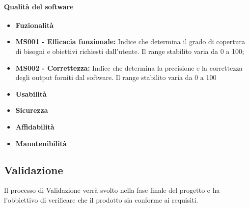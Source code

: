 \paragraph{Qualità del software} 
\begin{itemize}
	\item []\textbf{Fuzionalità}%
	\item \textbf{MS001 - Efficacia funzionale:} Indice che determina il grado di copertura di bisogni e obiettivi richiesti dall'utente. Il range stabilito varia da 0 a 100;
	\item \textbf{MS002 - Correttezza:} Indice che determina la precisione e la correttezza degli output forniti dal software. Il range stabilito varia da 0 a 100
	\item []\textbf{Usabilità}%
	\item []\textbf{Sicurezza}%
	\item []\textbf{Affidabilità}%
	\item []\textbf{Manutenibilità}%



\end{itemize}







\subsection{Validazione}
Il processo di Validazione verrà svolto nella fase finale del progetto e ha l'obbiettivo di verificare che il prodotto sia conforme ai requisiti.
